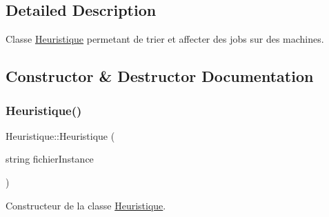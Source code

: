 \subsection{Detailed Description}
Classe \hyperlink{classHeuristique}{Heuristique} permetant de trier et affecter des jobs sur des machines. 

\subsection{Constructor \& Destructor Documentation}
\mbox{\label{classHeuristique_a58630433c6bac8eec9a5888945eba479}} 
\subsubsection{\texorpdfstring{Heuristique()}{Heuristique()}}
{\footnotesize\ttfamily Heuristique\+::\+Heuristique (\begin{DoxyParamCaption}\item[{string}]{fichier\+Instance }\end{DoxyParamCaption})}



Constructeur de la classe \hyperlink{classHeuristique}{Heuristique}. 


